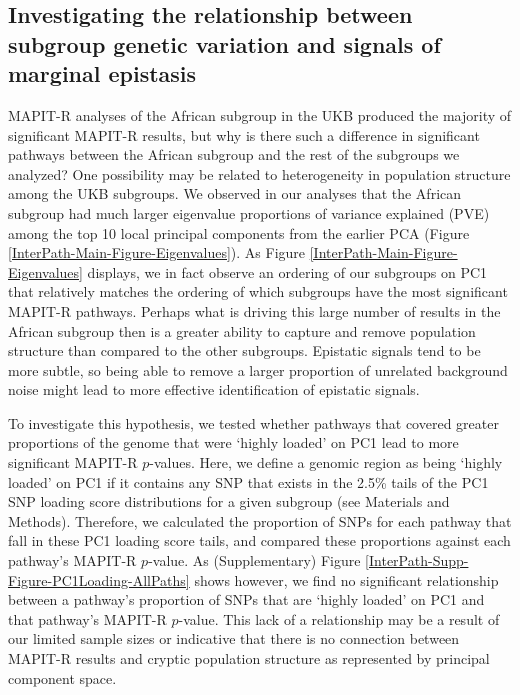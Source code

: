 
\subsection{Investigating the relationship between subgroup genetic variation and signals of marginal epistasis}

MAPIT-R analyses of the African subgroup in the UKB produced the majority of significant MAPIT-R results, but why is there such a difference in significant pathways between the African subgroup and the rest of the subgroups we analyzed? One possibility may be related to heterogeneity in population structure among the UKB subgroups. We observed in our analyses that the African subgroup had much larger eigenvalue proportions of variance explained (PVE) among the top 10 local principal components from the earlier PCA (Figure \ref{InterPath-Main-Figure-Eigenvalues}). As Figure \ref{InterPath-Main-Figure-Eigenvalues} displays, we in fact observe an ordering of our subgroups on PC1 that relatively matches the ordering of which subgroups have the most significant MAPIT-R pathways. Perhaps what is driving this large number of results in the African subgroup then is a greater ability to capture and remove population structure than compared to the other subgroups. Epistatic signals tend to be more subtle, so being able to remove a larger proportion of unrelated background noise might lead to more effective identification of epistatic signals. 

To investigate this hypothesis, we tested whether pathways that covered greater proportions of the genome that were `highly loaded' on PC1 lead to more significant MAPIT-R $p$-values. Here, we define a genomic region as being `highly loaded' on PC1 if it contains any SNP that exists in the 2.5\% tails of the PC1 SNP loading score distributions for a given subgroup (see Materials and Methods). Therefore, we calculated the proportion of SNPs for each pathway that fall in these PC1 loading score tails, and compared these proportions against each pathway's MAPIT-R $p$-value. As (Supplementary) Figure \ref{InterPath-Supp-Figure-PC1Loading-AllPaths} shows however, we find no significant relationship between a pathway's proportion of SNPs that are `highly loaded' on PC1 and that pathway's MAPIT-R $p$-value. This lack of a relationship may be a result of our limited sample sizes or indicative that there is no connection between MAPIT-R results and cryptic population structure as represented by principal component space.

